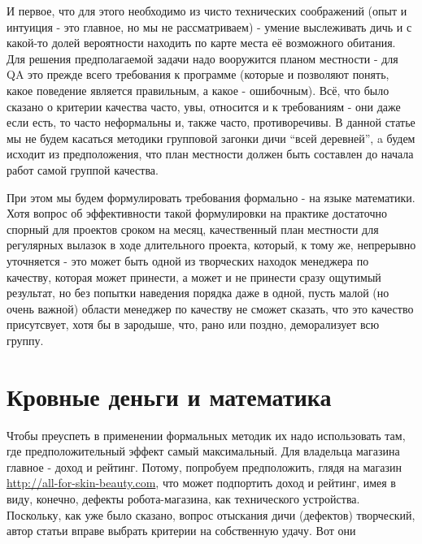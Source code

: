 \documentclass[a4paper]{book}
\begin{document}
И первое, что для этого необходимо из чисто технических
соображений (опыт и интуиция - это главное, но мы не
рассматриваем) - умение выслеживать дичь и с какой-то долей
вероятности находить по карте места её возможного обитания.  Для
решения предполагаемой задачи надо вооружится планом местности -
для QA это прежде всего требования к программе (которые и
позволяют понять, какое поведение является правильным, а какое -
ошибочным). Всё, что было сказано о критерии качества часто, увы,
относится и к требованиям - они даже если есть, то часто
неформальны и, также часто, противоречивы. В данной статье мы не
будем касаться методики групповой загонки дичи ``всей деревней'',
a будем исходит из предположения, что план местности должен
быть составлен до начала работ самой группой качества.

При этом мы будем формулировать требования формально - на языке
математики. Хотя вопрос об эффективности такой формулировки на
практике достаточно спорный для проектов сроком на месяц,
качественный план местности для регулярных вылазок в ходе
длительного проекта, который, к тому же, непрерывно уточняется -
это может быть одной из творческих находок менеджера по качеству,
которая может принести, а может и не принести сразу ощутимый
результат, но без попытки наведения порядка даже в одной, пусть
малой (но очень важной) области менеджер по качеству не сможет
сказать, что это качество присутсвует, хотя бы в зародыше, что,
рано или поздно, деморализует всю группу.

\section{Кровные деньги и математика}

Чтобы преуспеть в применении формальных методик их надо
использовать там, где предположительный эффект самый
максимальный. Для владельца магазина главное - доход и
рейтинг. Потому, попробуем предположить, глядя на магазин
\url{http://all-for-skin-beauty.com}, что может подпортить доход
и рейтинг, имея в виду, конечно, дефекты робота-магазина, как
технического устройства. Поскольку, как уже было сказано, вопрос
отыскания дичи (дефектов) творческий, автор статьи вправе выбрать
критерии на собственную удачу. Вот они
\end{document}

